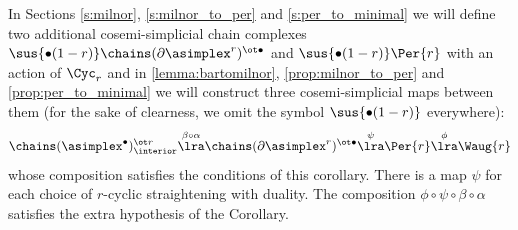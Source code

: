 In Sections \ref{s:milnor}, \ref{s:milnor_to_per} and \ref{s:per_to_minimal} we will define two additional cosemi-simplicial chain complexes $	\sus{\bullet(1-r) }\chains(\partial \asimplex^{r})^{\ot \bullet}$ and $\sus{\bullet(1-r)}\Per{r}$ with an action of $\Cyc_r$ and in \cref{lemma:bartomilnor}, \cref{prop:milnor_to_per} and \cref{prop:per_to_minimal} we will construct three cosemi-simplicial maps between them (for the sake of clearness, we omit the symbol $\sus{\bullet(1-r)}$ everywhere):  
\[
	\chains(\asimplex^{\bullet})^{\ot r}_{\interior}
	\overset{\beta\circ \alpha}{\lra}
	\chains(\partial \asimplex^{r})^{\ot \bullet }
	\overset{\psi}{\lra}
	\Per{r}
	\overset{\phi}{\lra}
	\Waug{r}
\]
whose composition satisfies the conditions of this corollary. There is a map $\psi$ for each choice of $r$-cyclic straightening with duality. The composition $\phi\circ\psi\circ\beta\circ\alpha$ satisfies the extra hypothesis of the Corollary.



